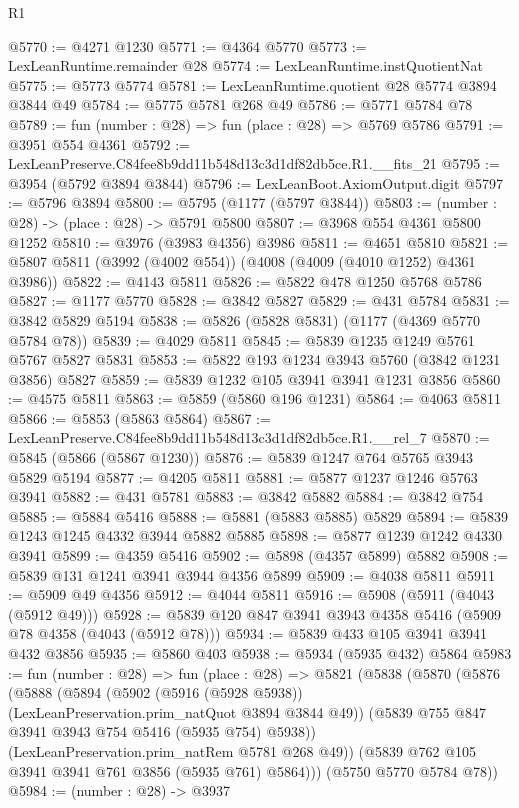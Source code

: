 \begin{lexlean}{R1}
\begin{coremodule}
@5770 := @4271 @1230
@5771 := @4364 @5770
@5773 := LexLeanRuntime.remainder @28
@5774 := LexLeanRuntime.instQuotientNat
@5775 := @5773 @5774
@5781 := LexLeanRuntime.quotient @28 @5774 @3894 @3844 @49
@5784 := @5775 @5781 @268 @49
@5786 := @5771 @5784 @78
@5789 := fun (number : @28) => fun (place : @28) => @5769 @5786
@5791 := @3951 @554 @4361
@5792 := LexLeanPreserve.C84fee8b9dd11b548d13c3d1df82db5ce.R1.__fits_21
@5795 := @3954 (@5792 @3894 @3844)
@5796 := LexLeanBoot.AxiomOutput.digit
@5797 := @5796 @3894
@5800 := @5795 (@1177 (@5797 @3844))
@5803 := (number : @28) -> (place : @28) -> @5791 @5800
@5807 := @3968 @554 @4361 @5800 @1252
@5810 := @3976 (@3983 @4356) @3986
@5811 := @4651 @5810
@5821 := @5807 @5811 (@3992 (@4002 @554)) (@4008 (@4009 (@4010 @1252) @4361 @3986))
@5822 := @4143 @5811
@5826 := @5822 @478 @1250 @5768 @5786
@5827 := @1177 @5770
@5828 := @3842 @5827
@5829 := @431 @5784
@5831 := @3842 @5829 @5194
@5838 := @5826 (@5828 @5831) (@1177 (@4369 @5770 @5784 @78))
@5839 := @4029 @5811
@5845 := @5839 @1235 @1249 @5761 @5767 @5827 @5831
@5853 := @5822 @193 @1234 @3943 @5760 (@3842 @1231 @3856) @5827
@5859 := @5839 @1232 @105 @3941 @3941 @1231 @3856
@5860 := @4575 @5811
@5863 := @5859 (@5860 @196 @1231)
@5864 := @4063 @5811
@5866 := @5853 (@5863 @5864)
@5867 := LexLeanPreserve.C84fee8b9dd11b548d13c3d1df82db5ce.R1.__rel_7
@5870 := @5845 (@5866 (@5867 @1230))
@5876 := @5839 @1247 @764 @5765 @3943 @5829 @5194
@5877 := @4205 @5811
@5881 := @5877 @1237 @1246 @5763 @3941
@5882 := @431 @5781
@5883 := @3842 @5882
@5884 := @3842 @754
@5885 := @5884 @5416
@5888 := @5881 (@5883 @5885) @5829
@5894 := @5839 @1243 @1245 @4332 @3944 @5882 @5885
@5898 := @5877 @1239 @1242 @4330 @3941
@5899 := @4359 @5416
@5902 := @5898 (@4357 @5899) @5882
@5908 := @5839 @131 @1241 @3941 @3944 @4356 @5899
@5909 := @4038 @5811
@5911 := @5909 @49 @4356
@5912 := @4044 @5811
@5916 := @5908 (@5911 (@4043 (@5912 @49)))
@5928 := @5839 @120 @847 @3941 @3943 @4358 @5416 (@5909 @78 @4358 (@4043 (@5912 @78)))
@5934 := @5839 @433 @105 @3941 @3941 @432 @3856
@5935 := @5860 @403
@5938 := @5934 (@5935 @432) @5864
@5983 := fun (number : @28) =>
  fun (place : @28) =>
  @5821
    (@5838
      (@5870
        (@5876
          (@5888
            (@5894
              (@5902 (@5916 (@5928 @5938)) (LexLeanPreservation.prim_natQuot @3894 @3844 @49))
              (@5839 @755 @847 @3941 @3943 @754 @5416 (@5935 @754) @5938))
            (LexLeanPreservation.prim_natRem @5781 @268 @49))
          (@5839 @762 @105 @3941 @3941 @761 @3856 (@5935 @761) @5864)))
      (@5750 @5770 @5784 @78))
@5984 := (number : @28) -> @3937

\end{coremodule}
\end{lexlean}
